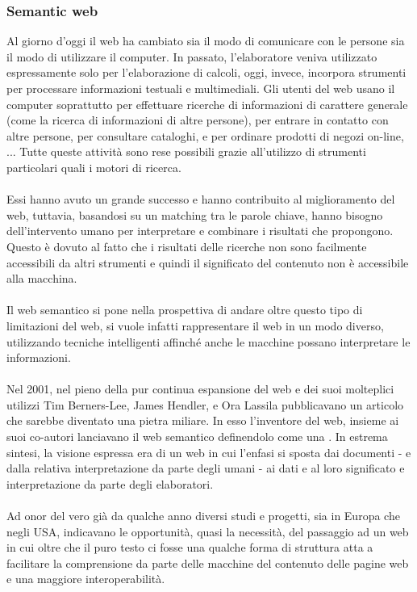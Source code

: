 \documentclass{article}
\theoremstyle{plain}
\theoremstyle{definition}
\begin{document}
\subsubsection{Semantic web}
Al giorno d'oggi il web ha cambiato sia il modo di comunicare con le persone sia il modo di utilizzare il computer. In passato, l'elaboratore veniva utilizzato espressamente solo per l'elaborazione di calcoli, oggi, invece, incorpora strumenti per processare informazioni testuali e multimediali. Gli utenti del web usano il computer soprattutto per effettuare ricerche di informazioni di carattere generale (come la ricerca di informazioni di altre persone), per entrare in contatto con altre persone, per consultare cataloghi, e per ordinare prodotti di negozi on-line, ... Tutte queste attività sono rese possibili grazie all'utilizzo di strumenti particolari quali i motori di ricerca. 
\\
\\
Essi hanno avuto un grande successo e hanno contribuito al miglioramento del web, tuttavia, basandosi su un matching tra le parole chiave, hanno bisogno dell'intervento umano per interpretare e combinare i risultati che propongono. Questo è dovuto al fatto che i risultati delle ricerche non sono facilmente accessibili da altri strumenti e quindi il significato del contenuto non è accessibile alla macchina. 
\\
\\
Il web semantico si pone nella prospettiva di andare oltre questo tipo di limitazioni del web, si vuole infatti rappresentare il web in un modo diverso, utilizzando tecniche intelligenti affinché anche le macchine possano interpretare le informazioni.
\\
\\
Nel 2001, nel pieno della pur continua espansione del web e dei suoi molteplici utilizzi Tim Berners-Lee, James Hendler, e Ora Lassila pubblicavano un articolo che sarebbe diventato una pietra miliare. In esso l'inventore del web, insieme ai suoi co-autori lanciavano il web semantico definendolo come una . In estrema sintesi, la visione espressa era di un web in cui l'enfasi si sposta dai documenti - e dalla relativa interpretazione da parte degli umani - ai dati e al loro significato e interpretazione da parte degli elaboratori.
\\ 
\\
Ad onor del vero già da qualche anno diversi studi e progetti, sia in Europa che negli USA, indicavano le opportunità, quasi la necessità, del passaggio ad un web in cui oltre che il puro testo ci fosse una qualche forma di struttura atta a facilitare la comprensione da parte delle macchine del contenuto delle pagine web e una maggiore interoperabilità. 
\end{document}
